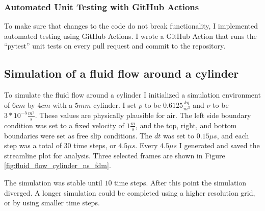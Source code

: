 \subsubsection{Automated Unit Testing with GitHub Actions}
To make sure that changes to the code do not break functionality, I implemented automated testing using GitHub Actions.
I wrote a GitHub Action that runs the ``pytest'' unit tests on every pull request and commit to the repository.

\subsection{Simulation of a fluid flow around a cylinder}

To simulate the fluid flow around a cylinder I initialized a simulation environment of $6cm$ by $4cm$ with a $5mm$ cylinder. I set $\rho$ to be $0.6125 \frac{kg}{m^3}$ and $\nu$ to be $3 * 10^{-5} \frac{m^2}{s}$. These values are physically plausible for air. The left side boundary condition was set to a fixed velocity of $1 \frac{m}{s}$, and the top, right, and bottom boundaries were set as free slip conditions. The $dt$ was set to $0.15 \mu s$, and each step was a total of $30$ time steps, or $4.5 \mu s$. Every $4.5 \mu s$ I generated and saved the streamline plot for analysis. Three selected frames are shown in Figure \ref{fig:fluid_flow_cylinder_ns_fdm}.

The simulation was stable until $10$ time steps. After this point the simulation diverged. A longer simulation could be completed using a higher resolution grid, or by using smaller time steps.


